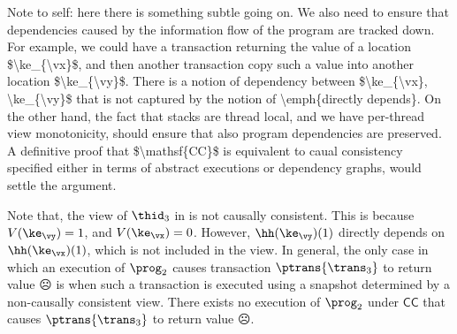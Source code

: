\ac{Note to self: here there is something subtle going on. We also need to ensure that dependencies 
caused by the information flow of the program are tracked down. For example, we could have a 
transaction returning the value of a location $\ke_{\vx}$, and then another transaction copy such a value 
into another location $\ke_{\vy}$. There is a notion of dependency between $\ke_{\vx}, \ke_{\vy}$ that 
is not captured by the notion of \emph{directly depends}. On the other hand, the fact that 
stacks are thread local, and we have per-thread view monotonicity, should ensure that also program 
dependencies are preserved. A definitive proof that $\mathsf{CC}$ is equivalent to caual consistency 
specified either in terms of abstract executions or dependency graphs, would settle the argument.}

Note that, the view of $\thid_3$ in  is not causally consistent.
This is because $V(\ke_{\vy}) = 1$, and $V(\ke_{\vx}) = 0$. However, $\hh(\ke_{\vy})(1)$ directly depends 
on $\hh(\ke_{\vx})(1)$, which is not included in the view. 
In general, the only case in which an execution of $\prog_2$ causes transaction $\ptrans{\trans_3}$ to return value $\sadface$ is when such a transaction is executed using a snapshot determined by a non-causally consistent view. 
There exists no execution of $\prog_2$ under $\mathsf{CC}$ that causes $\ptrans{\trans_3}$ to return value $\sadface$.


%
